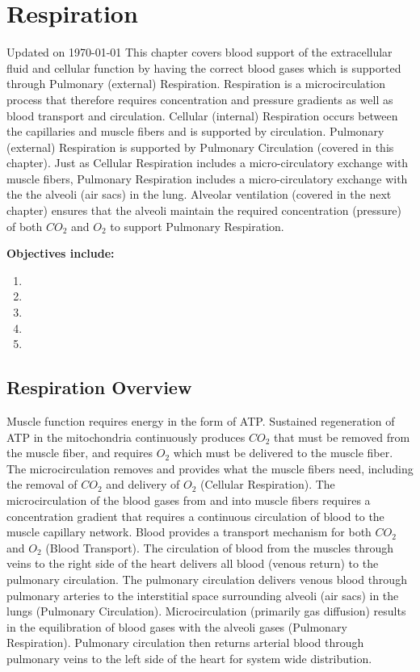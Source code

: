 \chapter{Respiration}\label{chp:blood_oxygen}
Updated on \today
\minitoc
This chapter covers blood support of the extracellular fluid and cellular function by having the correct blood gases which is supported through Pulmonary (external) Respiration. Respiration is a microcirculation process that therefore requires concentration and pressure gradients as well as blood transport and circulation. Cellular (internal) Respiration occurs between the capillaries and muscle fibers and is supported by circulation. Pulmonary (external) Respiration is supported by Pulmonary Circulation (covered in this chapter). Just as Cellular Respiration includes a micro-circulatory exchange with muscle fibers, Pulmonary Respiration includes a micro-circulatory exchange with the the alveoli (air sacs) in the lung. Alveolar ventilation (covered in the next chapter) ensures that the alveoli maintain the required concentration (pressure) of both $CO_2$ and $O_2$ to support Pulmonary Respiration.

\vspace{5mm}

\textbf{Objectives include:}
\begin{enumerate}
    \item
    \item
    \item
    \item
    \item
\end{enumerate}

\section{Respiration Overview}
Muscle function requires energy in the form of ATP. Sustained regeneration of ATP in the mitochondria continuously produces $CO_2$ that must be removed from the muscle fiber, and requires $O_2$ which must be delivered to the muscle fiber. The microcirculation removes and provides what the muscle fibers need, including the removal of $CO_2$ and delivery of $O_2$ (Cellular Respiration). The microcirculation of the blood gases from and into muscle fibers requires a concentration gradient that requires a continuous circulation of blood to the muscle capillary network. Blood provides a transport mechanism for both $CO_2$ and $O_2$ (Blood Transport). The circulation of blood from the muscles through veins to the right side of the heart delivers all blood (venous return) to the pulmonary circulation. The pulmonary circulation delivers venous blood through pulmonary arteries to the interstitial space surrounding alveoli (air sacs) in the lungs (Pulmonary Circulation). Microcirculation (primarily gas diffusion) results in the equilibration of blood gases with the alveoli gases (Pulmonary Respiration). Pulmonary circulation then returns arterial blood through pulmonary veins to the left side of the heart for system wide distribution.

